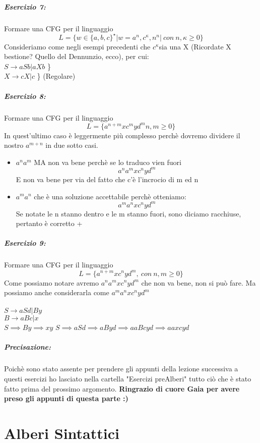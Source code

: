 \documentclass[12pt, a4paper, openany, oneside]{book}
\begin{document}
\paragraph{Esercizio 7: }Formare una CFG per il linguaggio \\
$$L = \{ w\in \{a,b,c\}^{\star} | w = a^{n}, c^{\kappa}, n^{n}
 | ~ con ~ n, \kappa \geq 0 \}$$
Consideriamo come negli esempi precedenti che $c^{\kappa} $sia una X (Ricordate 
X bestione? Quello del Dennunzio, ecco), per cui: \\
$S \to aSb | aXb$ \} \\
$X \to cX | c$ \} (Regolare)\\
\paragraph{Esercizio 8: }Formare una CFG per il linguaggio \\
$$L = \{ a^{n+m} x c^{m} y d^{m} n, m \geq 0 \}$$
In quest'ultimo caso è leggermente più complesso perchè dovremo dividere 
il nostro $a^{m+n}$ in due sotto casi.
\begin{itemize}
	\item $a^{n}a^{m}$ MA non va bene perchè se lo traduco vien fuori 
	$$a^{n}a^{m} x c^{n}yd^{m}$$
	E non va bene per via del fatto che c'è l'incrocio di m ed n
	\item $a^{m}a^{n}$ che è una soluzione accettabile perchè otteniamo:
	$$a^{m}a^{n} x c^{n}y d^{m}$$ Se notate le n stanno dentro e le m stanno 
	fuori, sono diciamo racchiuse, pertanto è corretto +
\end{itemize}

\paragraph{Esercizio 9: }Formare una CFG per il linguaggio \\
$$L = \{ a^{n+m}xc^{n}yd^{m}, ~con~n,m \geq 0 \}$$
Come possiamo notare avremo $a^{n}a^{m}xc^{n}yd^{m}$ che non va bene, non si 
può fare. Ma possiamo anche considerarla come $a^{m}a^{n}xc^{n}yd^{m}$ \\ \\
$S \to aSd | By$ \\
$B \to aBc | x$ \\
$S \implies By \implies xy$
$S \implies aSd \implies aByd \implies aaBcyd \implies aaxcyd$

\paragraph{Precisazione: } Poichè sono stato assente per prendere gli appunti
della lezione successiva a questi esercizi ho lasciato nella cartella "Esercizi
preAlberi" tutto ciò che è stato fatto prima del prossimo argomento. \textbf{
Ringrazio di cuore Gaia per avere preso gli appunti di questa parte :)}
\chapter{Alberi Sintattici}
\end{document}

